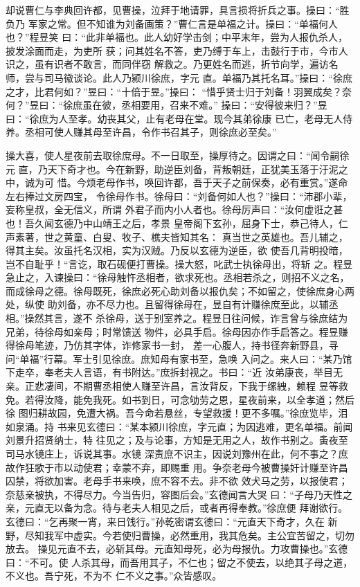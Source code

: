 却说曹仁与李典回许都，见曹操，泣拜于地请罪，具言损将折兵之事。操曰：“胜负乃
军家之常。但不知谁为刘备画策？”曹仁言是单福之计。操曰：“单福何人也？”程昱笑
曰：“此非单福也。此人幼好学击剑；中平末年，尝为人报仇杀人，披发涂面而走，为吏所
获；问其姓名不答，吏乃缚于车上，击鼓行于市，今市人识之，虽有识者不敢言，而同伴窃
解救之。乃更姓名而逃，折节向学，遍访名师，尝与司马徽谈论。此人乃颍川徐庶，字元
直。单福乃其托名耳。”操曰：“徐庶之才，比君何如？”昱曰：“十倍于昱。”操曰：
“惜乎贤士归于刘备！羽翼成矣？奈何？”昱曰：“徐庶虽在彼，丞相要用，召来不难。”
操曰：“安得彼来归？”昱曰：“徐庶为人至孝。幼丧其父，止有老母在堂。现今其弟徐康
已亡，老母无人侍养。丞相可使人赚其母至许昌，令作书召其子，则徐庶必至矣。”

操大喜，使人星夜前去取徐庶母。不一日取至，操厚待之。因谓之曰：“闻令嗣徐元
直，乃天下奇才也。今在新野，助逆臣刘备，背叛朝廷，正犹美玉落于汙泥之中，诚为可
惜。今烦老母作书，唤回许都，吾于天子之前保奏，必有重赏。”遂命左右捧过文房四宝，
令徐母作书。徐母曰：“刘备何如人也？”操曰：“沛郡小辈，妄称皇叔，全无信义，所谓
外君子而内小人者也。徐母厉声曰：“汝何虚诳之甚也！吾久闻玄德乃中山靖王之后，孝景
皇帝阁下玄孙，屈身下士，恭己待人，仁声素著，世之黄童、白叟、牧子、樵夫皆知其名：
真当世之英雄也。吾儿辅之，得其主矣。汝虽托名汉相，实为汉贼。乃反以玄德为逆臣，欲
使吾几背明投暗，岂不自耻乎！“言讫，取石砚便打曹操。操大怒，叱武士执徐母出，将斩
之。程昱急止之，入谏操曰：“徐母触忤丞相者，欲求死也。丞相若杀之，则招不义之名，
而成徐母之德。徐母既死，徐庶必死心助刘备以报仇矣；不如留之，使徐庶身心两处，纵使
助刘备，亦不尽力也。且留得徐母在，昱自有计赚徐庶至此，以辅丞相。”操然其言，遂不
杀徐母，送于别室养之。程昱日往问候，诈言曾与徐庶结为兄弟，待徐母如亲母；时常馈送
物件，必具手启。徐母因亦作手启答之。程昱赚得徐母笔迹，乃仿其字体，诈修家书一封，
差一心腹人，持书径奔新野县，寻问“单福”行幕。军士引见徐庶。庶知母有家书至，急唤
入问之。来人曰：“某乃馆下走卒，奉老夫人言语，有书附达。”庶拆封视之。书曰：“近
汝弟康丧，举目无亲。正悲凄间，不期曹丞相使人赚至许昌，言汝背反，下我于缧絏，赖程
昱等救免。若得汝降，能免我死。如书到日，可念劬劳之恩，星夜前来，以全孝道；然后徐
图归耕故园，免遭大祸。吾今命若悬丝，专望救援！更不多嘱。”徐庶览毕，泪如泉涌。持
书来见玄德曰：“某本颍川徐庶，字元直；为因逃难，更名单福。前闻刘景升招贤纳士，特
往见之；及与论事，方知是无用之人，故作书别之。夤夜至司马水镜庄上，诉说其事。水镜
深责庶不识主，因说刘豫州在此，何不事之？庶故作狂歌于市以动使君；幸蒙不弃，即赐重
用。争奈老母今被曹操奸计赚至许昌囚禁，将欲加害。老母手书来唤，庶不容不去。非不欲
效犬马之劳，以报使君；奈慈亲被执，不得尽力。今当告归，容图后会。”玄德闻言大哭
曰：“子母乃天性之亲，元直无以备为念。待与老夫人相见之后，或者再得奉教。”徐庶便
拜谢欲行。玄德曰：“乞再聚一宵，来日饯行。”孙乾密谓玄德曰：“元直天下奇才，久在
新野，尽知我军中虚实。今若使归曹操，必然重用，我其危矣。主公宜苦留之，切勿放去。
操见元直不去，必斩其母。元直知母死，必为母报仇。力攻曹操也。”玄德曰：“不可。使
人杀其母，而吾用其子，不仁也；留之不使去，以绝其子母之道，不义也。吾宁死，不为不
仁不义之事。”众皆感叹。

